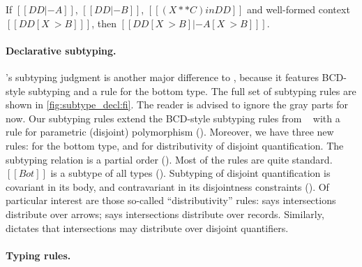 \begin{lemma} \label{lemma:general_lemma}
  If $[[DD |- A]]$, $[[DD |- B]]$, $[[ (X ** C) in DD  ]]$
  and well-formed context $[[  DD [ X ~> B ]   ]]$, then $[[   DD [ X ~> B ] |-  A [ X ~> B  ]     ]]$.
\end{lemma}


\paragraph{Declarative subtyping.}

\fnamee's subtyping judgment is another major difference to \fname, because it
features BCD-style subtyping and a rule for the bottom type.
The full set of subtyping rules are shown in
\cref{fig:subtype_decl:fi}. The reader is advised to ignore the gray parts for
now. Our subtyping rules extend the BCD-style subtyping rules from
\namee~\cite{bi_et_al:LIPIcs:2018:9227} with a rule for parametric
(disjoint) polymorphism (). Moreover, we have three new rules:
 for the bottom type, and  for distributivity of
disjoint quantification. The subtyping relation is a partial order
(). Most of the rules are quite standard. $[[Bot]]$ is a subtype of all types ().
Subtyping of disjoint quantification is covariant in its body, and
contravariant in its disjointness constraints (). Of particular interest are those
so-called ``distributivity'' rules:  says intersections
distribute over arrows;  says intersections distribute over
records. Similarly,  dictates that
intersections may distribute over disjoint quantifiers.


\paragraph{Typing rules.}

